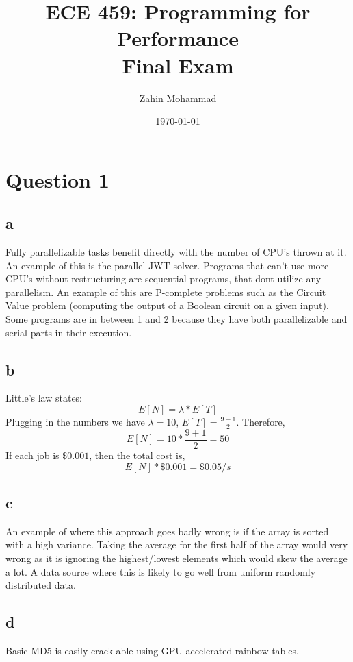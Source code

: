 \documentclass[12pt]{article}
\title{ECE 459: Programming for Performance\\Final Exam}
\author{Zahin Mohammad}
\date{\today}
\begin{document}
\maketitle

\section{Question 1}
\subsection{a}
Fully parallelizable tasks benefit directly with the number of CPU's thrown at it.
An example of this is the parallel JWT solver.
Programs that can't use more CPU's without restructuring are sequential programs, that dont utilize any parallelism.
An example of this are P-complete problems such as the Circuit Value problem (computing the output of a Boolean circuit on a given input).
Some programs are in between 1 and 2 because they have both parallelizable and serial parts in their execution.

\subsection{b}
Little's law states:
\begin{equation}
    E[N] = \lambda * E[T]
\end{equation}
Plugging in the numbers we have $\lambda = 10$, $E[T] = \frac{9+1}{2}$.
Therefore,
\begin{equation}
    E[N] = 10*\frac{9+1}{2} = 50
\end{equation}
If each job is $\$0.001$, then the total cost is,
\begin{equation}
    E[N]*\$0.001 = \$0.05/s
\end{equation}
\subsection{c}
An example of where this approach goes badly wrong is if the array is sorted with a high variance.
Taking the average for the first half of the array would very wrong as it is ignoring the highest/lowest elements which would skew the average a lot.
A data source where this is likely to go well from uniform randomly distributed data.

\subsection{d}
Basic MD5 is easily crack-able using GPU accelerated rainbow tables.
\end{document}
